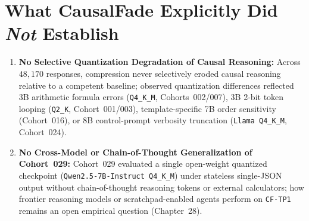 \section{What CausalFade Explicitly Did \emph{Not} Establish}
\begin{enumerate}
  \item \textbf{No Selective Quantization Degradation of Causal Reasoning:} Across $48{,}170$ responses, compression never selectively eroded causal reasoning relative to a competent baseline; observed quantization differences reflected 3B arithmetic formula errors (\texttt{Q4\_K\_M}, Cohorts~002/007), 3B 2-bit token looping (\texttt{Q2\_K}, Cohort~001/003), template-specific 7B order sensitivity (Cohort~016), or 8B control-prompt verbosity truncation (\texttt{Llama Q4\_K\_M}, Cohort~024).
  \item \textbf{No Cross-Model or Chain-of-Thought Generalization of Cohort~029:} Cohort~029 evaluated a single open-weight quantized checkpoint (\texttt{Qwen2.5-7B-Instruct Q4\_K\_M}) under stateless single-JSON output without chain-of-thought reasoning tokens or external calculators; how frontier reasoning models or scratchpad-enabled agents perform on \texttt{CF-TP1} remains an open empirical question (Chapter~28).
\end{enumerate}
